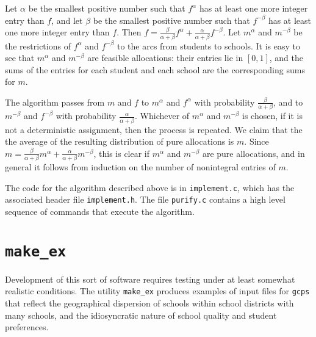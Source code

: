 \documentclass[12pt]{article}
\theoremstyle{definition}
\begin{document}
Let $\alpha$ be the smallest positive number such that $f^\alpha$ has
at least one more integer entry than $f$, and let $\beta$ be the
smallest positive number such that $f^{-\beta}$ has at least one more
integer entry than $f$.  Then $f = \tfrac{\beta}{\alpha +
  \beta}f^\alpha + \tfrac{\alpha}{\alpha + \beta}f^{-\beta}$.  Let
$m^\alpha$ and $m^{-\beta}$ be the restrictions of $f^\alpha$ and
$f^{-\beta}$ to the arcs from students to schools.  It is easy to see
that $m^\alpha$ and $m^{-\beta}$ are feasible allocations: their
entries lie in $[0,1]$, and the sums of the entries for each student
and each school are the corresponding sums for $m$.

The algorithm passes from $m$ and $f$ to $m^\alpha$ and $f^{\alpha}$
with probability $\tfrac{\beta}{\alpha + \beta}$, and to $m^{-\beta}$
and $f^{-\beta}$ with probability $\tfrac{\alpha}{\alpha + \beta}$.
Whichever of $m^\alpha$ and $m^{-\beta}$ is chosen, if it is not a
deterministic assignment, then the process is repeated.  We claim that
the the average of the resulting distribution of pure allocations is
$m$.  Since $m = \tfrac{\beta}{\alpha + \beta}m^\alpha +
\tfrac{\alpha}{\alpha + \beta}m^{-\beta}$, this is clear if $m^\alpha$
and $m^{-\beta}$ are pure allocations, and in general it follows from
induction on the number of nonintegral entries of $m$.

The code for the algorithm described above is in \texttt{implement.c},
which has the associated header file \texttt{implement.h}.  The file
\texttt{purify.c} contains a high level sequence of commands that
execute the algorithm.

\section{\texttt{make\_ex}} \label{sec:MakeEx}

Development of this sort of software requires testing under at least
somewhat realistic conditions.  The utility \texttt{make\_ex} produces
examples of input files for \texttt{gcps} that reflect the
geographical dispersion of schools within school districts with many
schools, and the idiosyncratic nature of school quality and student
preferences.
\end{document}
